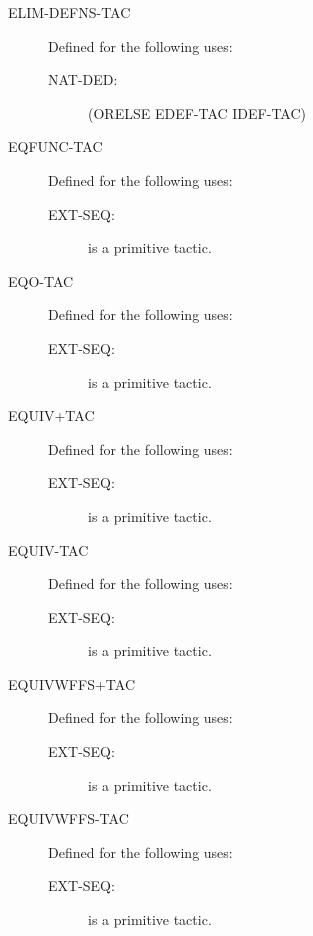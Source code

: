 \begin{description}
\begin{description}
\end{description}

\item[ELIM-DEFNS-TAC]  Defined for the following uses:
\begin{description}
\item[NAT-DED:] 
(ORELSE EDEF-TAC IDEF-TAC)


\end{description}

\item[EQFUNC-TAC]  Defined for the following uses:
\begin{description}
\item[EXT-SEQ:]  is a primitive tactic.

\end{description}

\item[EQO-TAC]  Defined for the following uses:
\begin{description}
\item[EXT-SEQ:]  is a primitive tactic.

\end{description}

\item[EQUIV+TAC]  Defined for the following uses:
\begin{description}
\item[EXT-SEQ:]  is a primitive tactic.

\end{description}

\item[EQUIV-TAC]  Defined for the following uses:
\begin{description}
\item[EXT-SEQ:]  is a primitive tactic.

\end{description}

\item[EQUIVWFFS+TAC]  Defined for the following uses:
\begin{description}
\item[EXT-SEQ:]  is a primitive tactic.

\end{description}

\item[EQUIVWFFS-TAC]  Defined for the following uses:
\begin{description}
\item[EXT-SEQ:]  is a primitive tactic.


\end{description}
\end{description}
